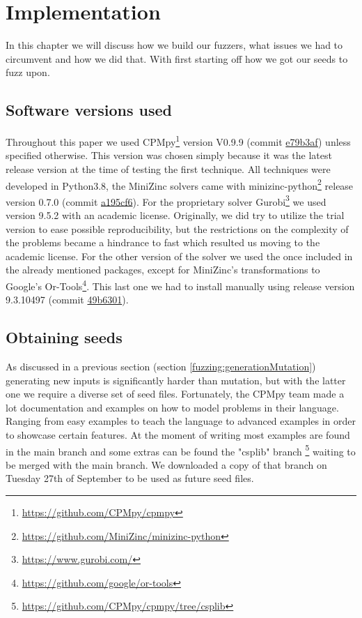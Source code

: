 \chapter{Implementation}
\label{cha:impl}
\label{impl:Intro}
In this chapter we will discuss how we build our fuzzers, what issues we had to circumvent and how we did that. With first starting off how we got our seeds to fuzz upon.

\section{Software versions used}
Throughout this paper we used CPMpy\footnote{\url{https://github.com/CPMpy/cpmpy}} version V0.9.9 (commit \href{https://github.com/CPMpy/cpmpy/commit/e79b3afedc934a9437c2ddb3a9f54d7e2d7bd3ee}{e79b3af}) unless specified otherwise. This version was chosen simply because it was the latest release version at the time of testing the first technique. All techniques were developed in Python3.8, the MiniZinc solvers came with minizinc-python\footnote{\url{https://github.com/MiniZinc/minizinc-python}} release version 0.7.0 (commit \href{https://github.com/MiniZinc/minizinc-python/commit/a195cf63fcfbc98665d70ab64efb5424db25bd7e}{a195cf6}). For the proprietary solver Gurobi\footnote{\url{https://www.gurobi.com/}} we used version 9.5.2 with an academic license. 
Originally, we did try to utilize the trial version to ease possible reproducibility, but the restrictions on the complexity of the problems became a hindrance to fast which resulted us moving to the academic license. For the other version of the solver we used the once included in the already mentioned packages, except for MiniZinc's transformations to Google's Or-Tools\footnote{\url{https://github.com/google/or-tools}}. This last one we had to install manually using release version 9.3.10497 (commit \href{https://github.com/google/or-tools/commit/49b6301e1e1e231d654d79b6032e79809868a70e}{49b6301}).


\section{Obtaining seeds}
\label{impl:obtainingSeeds}
As discussed in a previous section (section \ref{fuzzing:generationMutation}) generating new inputs is significantly harder than mutation, but with the latter one we require a diverse set of seed files. Fortunately, the CPMpy team made a lot documentation and examples on how to model problems in their language. Ranging from easy examples to teach the language to advanced examples in order to showcase certain features. 
At the moment of writing most examples are found in the main branch and some extras can be found the "csplib" branch \footnote{\url{https://github.com/CPMpy/cpmpy/tree/csplib}} waiting to be merged with the main branch. We downloaded a copy of that branch on Tuesday 27th of September to be used as future seed files. 

